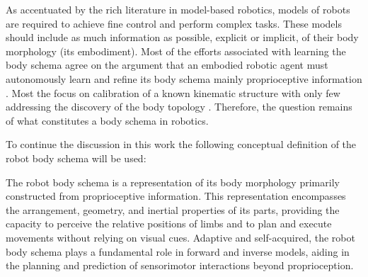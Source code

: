 
As accentuated by the rich literature in model-based robotics, models of robots are required to achieve fine control and perform complex tasks. These models should include as much information as possible, explicit or implicit, of their body morphology (its embodiment). Most of the efforts associated with learning the body schema agree on the argument that an embodied robotic agent must autonomously learn and refine its body schema mainly proprioceptive information \cite{Morasso2015Revisitingbodyschema, Hoffmann2010Bodyschemarobotics}. Most the focus on calibration of a known kinematic structure  with only few addressing the discovery of the body topology .  Therefore, the question remains of what constitutes a body schema in robotics. %

To continue the discussion in this work the following conceptual definition of the robot body schema will be used:

\begin{definition}\label{def:robot_body_schema}
	The robot body schema is a representation of its body morphology primarily constructed from proprioceptive information. This representation encompasses the arrangement, geometry, and inertial properties of its parts, providing the capacity to perceive the relative positions of limbs and to plan and execute movements without relying on visual cues. Adaptive and self-acquired, the robot body schema plays a fundamental role in forward and inverse models, aiding in the planning and prediction of sensorimotor interactions beyond proprioception.
\end{definition}

